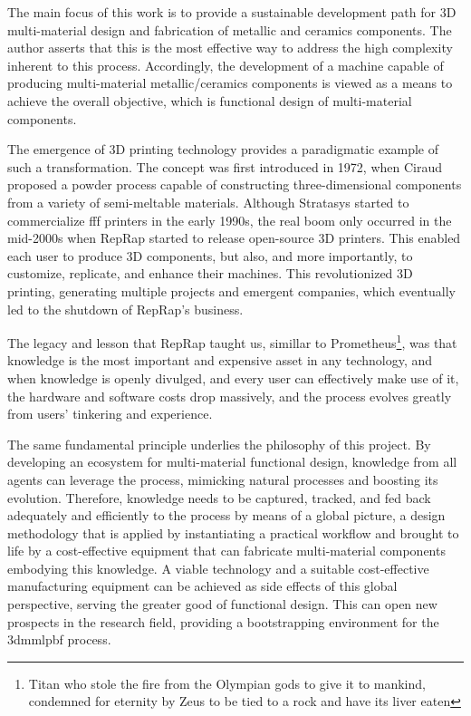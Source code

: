 The main focus of this work is to provide a sustainable development path for
3D multi-material design and fabrication of metallic and ceramics components.
The author asserts that this is the most effective way to address the high
complexity inherent to this process. Accordingly, the development of a machine
capable of producing multi-material metallic/ceramics components is viewed as a
means to achieve the overall objective, which is functional design of
multi-material components.

The emergence of 3D printing technology provides a paradigmatic example of such
a transformation. The concept was first introduced in 1972, when
Ciraud~\cite{ciraud1972process} proposed a powder process capable of
constructing three-dimensional components from a variety of semi-meltable
materials. Although Stratasys started to commercialize \gls{fff} printers in the
early 1990s, the real boom only occurred in the mid-2000s when RepRap started to
release open-source 3D printers.
This enabled each user to produce 3D components, but also, and more importantly,
to customize, replicate, and enhance their machines. This revolutionized 3D printing, generating multiple projects and emergent companies, which eventually led to the shutdown of RepRap's business.

The legacy and lesson that RepRap taught us, simillar to Prometheus\footnote{Titan who stole the fire
from the Olympian gods to give it to mankind, condemned for eternity by Zeus to
be tied to a rock and have its liver eaten}, was that knowledge is the most important and
expensive asset in any technology, and when knowledge is openly divulged, and
every user can effectively make use of it, the hardware and software costs drop
massively, and the process evolves greatly from users' tinkering and experience.

The same fundamental principle underlies the philosophy of this project. By
developing an ecosystem for multi-material functional design, knowledge from all
agents can leverage the process, mimicking natural processes and boosting its
evolution. Therefore, knowledge needs to be captured, tracked, and fed back
adequately and efficiently to the process by means of a global picture, a design
methodology that is applied by instantiating a practical workflow and brought to
life by a cost-effective equipment that can fabricate multi-material components
embodying this knowledge. A viable technology and a suitable cost-effective
manufacturing equipment can be achieved as side effects of this global
perspective, serving the greater good of functional design. This can open new
prospects in the research field, providing a bootstrapping environment for
the \gls{3dmmlpbf} process.

